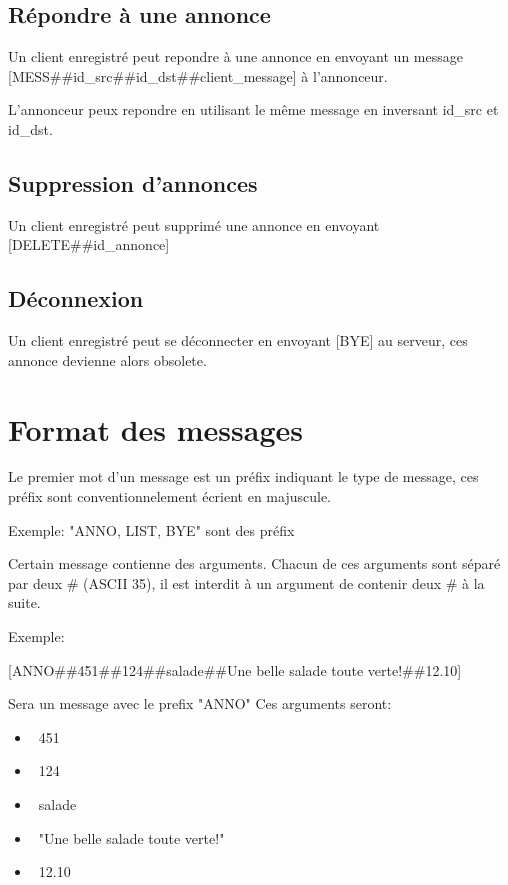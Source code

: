 \documentclass[12pt]{article}
\begin{document}
\subsection{Répondre à une annonce}

Un client enregistré peut repondre à une annonce en envoyant un message [MESS\#\#id\_src\#\#id\_dst\#\#client\_message] à l'annonceur.

L'annonceur peux repondre en utilisant le même message en inversant id\_src et id\_dst.



\subsection{Suppression d'annonces}

Un client enregistré peut supprimé une annonce en envoyant [DELETE\#\#id\_annonce]


\subsection{Déconnexion}

Un client enregistré peut se déconnecter en envoyant [BYE] au serveur, ces annonce devienne alors obsolete.

\section{Format des messages}


Le premier mot d'un message est un préfix indiquant le type de message, ces préfix sont conventionnelement écrient en majuscule.

Exemple: "ANNO, LIST, BYE" sont des préfix

Certain message contienne des arguments. Chacun de ces arguments sont séparé par deux \# (ASCII 35),
il est interdit à un argument de contenir deux \# à la suite.

Exemple:

[ANNO\#\#451\#\#124\#\#salade\#\#Une belle salade toute verte!\#\#12.10]

Sera un message avec le prefix "ANNO"
Ces arguments seront:
\begin{itemize}
  \item~451
  \item~124
  \item~salade
  \item~"Une belle salade toute verte!"
  \item~12.10
\end{itemize}
\end{document}
